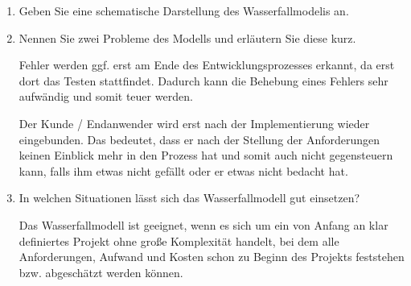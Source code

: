 \documentclass{lehramt-informatik-minimal}
\begin{document}
\begin{enumerate}


\item Geben Sie eine schematische Darstellung des Wasserfallmodelis an.


\begin{antwort}
\end{antwort}


\item Nennen Sie zwei Probleme des Modells und erläutern Sie diese kurz.

\begin{antwort}
Fehler werden ggf. erst am Ende des Entwicklungsprozesses erkannt, da
erst dort das Testen stattfindet. Dadurch kann die Behebung eines
Fehlers sehr aufwändig und somit teuer werden.

Der Kunde / Endanwender wird erst nach der Implementierung wieder
eingebunden. Das bedeutet, dass er nach der Stellung der Anforderungen
keinen Einblick mehr in den Prozess hat und somit auch nicht
gegensteuern kann, falls ihm etwas nicht gefällt oder er etwas nicht
bedacht hat.
\end{antwort}


\item In welchen Situationen lässt sich das Wasserfallmodell gut
einsetzen?

\begin{antwort}
Das Wasserfallmodell ist geeignet, wenn es sich um ein von Anfang an
klar definiertes Projekt ohne große Komplexität handelt, bei dem alle
Anforderungen, Aufwand und Kosten schon zu Beginn des Projekts
feststehen bzw. abgeschätzt werden können.
\end{antwort}

\end{enumerate}
\end{document}
